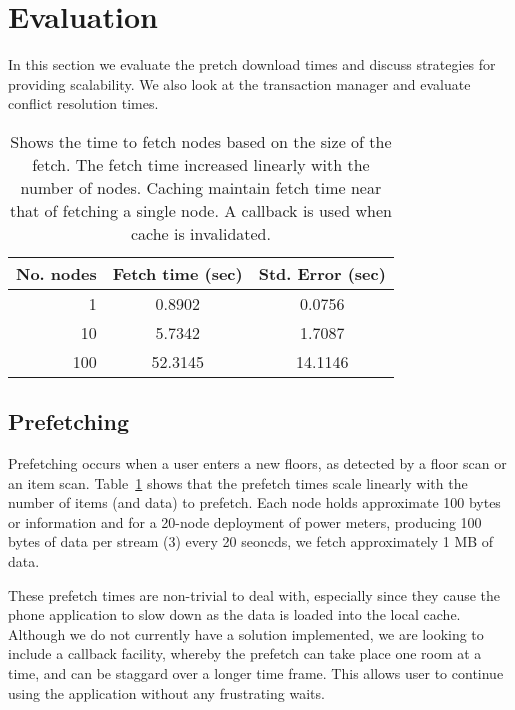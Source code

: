 \section{Evaluation}
\label{sec:eval}
In this section we evaluate the pretch download times and discuss strategies for providing scalability.  We also
look at the transaction manager and evaluate conflict resolution times.


\begin{table}
\begin{center}
  \begin{tabular}{| r | c  c | }
    \hline
    {\bf No. nodes } & {\bf Fetch time (sec) } & {\bf Std. Error (sec)} \\ \hline
    1 & 0.8902 & 0.0756 \\ \hline
    10 & 5.7342 & 1.7087 \\ \hline
    100 & 52.3145 & 14.1146 \\ 
    \hline
  \end{tabular}
\caption{Shows the time to fetch nodes based on the size of the fetch.  The fetch time
increased linearly with the number of nodes.  Caching maintain fetch time near
that of fetching a single node.  A callback is used when cache is invalidated.}
\label{tab:prefetchtimes}
\end{center}
\end{table}

\subsection{Prefetching}
Prefetching occurs when a user enters a new floors, as detected by a floor scan or an item
scan.  Table~\ref{tab:prefetchtimes} shows that the prefetch times scale linearly with the number of
items (and data) to prefetch.  Each node holds approximate 100 bytes or information and for
a 20-node deployment of power meters, producing 100 bytes of data per stream (3) every 20 seoncds, we fetch 
approximately 1 MB of data.


These prefetch times are non-trivial to deal with, especially since they cause the phone application to slow down
as the data is loaded into the local cache.  Although we do not currently have a solution implemented, we are
looking to include a callback facility, whereby the prefetch can take place one room at a time, and can be staggard over
a longer time frame.  This allows user to continue using the application without any frustrating waits.

